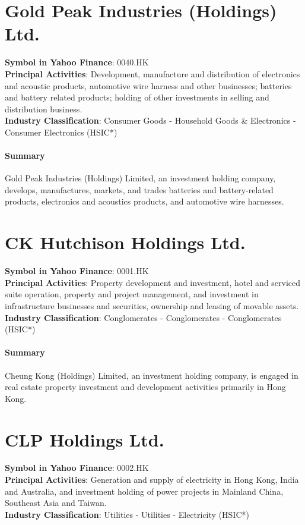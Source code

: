 \section{Gold Peak Industries (Holdings) Ltd.}
\textbf{Symbol in Yahoo Finance}: 0040.HK\\
\textbf{Principal Activities}: Development, manufacture and distribution of electronics and acoustic products, automotive wire harness and other businesses; batteries and battery related products; holding of other investments in selling and distribution business.\\
\textbf{Industry Classification}: Consumer Goods - Household Goods \& Electronics - Consumer Electronics (HSIC*)
\paragraph{Summary}
Gold Peak Industries (Holdings) Limited, an investment holding company, develops, manufactures, markets, and trades batteries and battery-related products, electronics and acoustics products, and automotive wire harnesses.


\section{CK Hutchison Holdings Ltd.}
\textbf{Symbol in Yahoo Finance}: 0001.HK\\
\textbf{Principal Activities}: Property development and investment, hotel and serviced suite operation, property and project management, and investment in infrastructure businesses and securities, ownership and leasing of movable assets.\\
\textbf{Industry Classification}: Conglomerates - Conglomerates - Conglomerates (HSIC*)
\paragraph{Summary}
Cheung Kong (Holdings) Limited, an investment holding company, is engaged in real estate property investment and development activities primarily in Hong Kong.


\section{CLP Holdings Ltd.}
\textbf{Symbol in Yahoo Finance}: 0002.HK\\
\textbf{Principal Activities}: Generation and supply of electricity in Hong Kong, India and Australia, and investment holding of power projects in Mainland China, Southeast Asia and Taiwan.\\
\textbf{Industry Classification}: Utilities - Utilities - Electricity (HSIC*)
